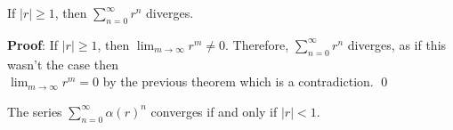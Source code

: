 \begin{theorem}
If $|r| \geq 1$, then $\sum_{n=0}^\infty r^n$ diverges.
\end{theorem}
\textbf{Proof}: If $|r|\geq 1$, then $\lim_{m\to \infty}r^m \neq 0$. Therefore, 
$\sum_{n=0}^\infty r^n$ diverges, as if this wasn't the case then \\
$\lim_{m\to \infty} r^m =0$ by the previous theorem which is a contradiction. \qed 

\begin{corollary}
The series $\sum_{n=0}^\infty \alpha(r)^n$ converges if and only if $|r|< 1$.
\end{corollary}